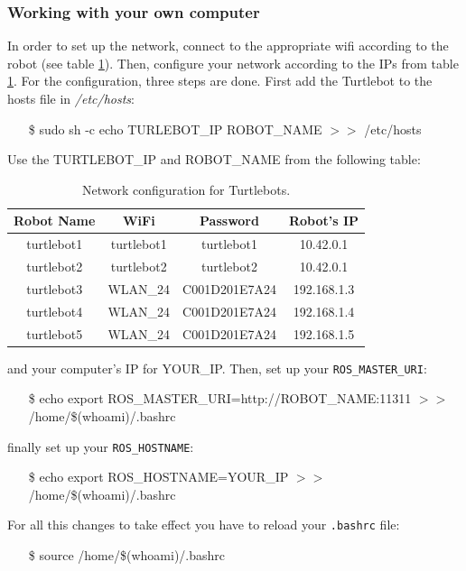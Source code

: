 \documentclass[a4paper,10pt]{article}
\begin{document}
\subsubsection{Working with your own computer}
In order to set up the network, connect to the appropriate wifi according to the robot (see table \ref{tab:ips}). Then, configure your network according to the IPs from table \ref{tab:ips}. For the configuration, three steps are done. First add the Turtlebot to the hosts file in \textit{/etc/hosts}: 
\begin{shaded}
	\begin{itemize}
		\item[\$] sudo sh -c \textquotesingle echo TURLEBOT\_IP  ROBOT\_NAME $>>$ /etc/hosts\textquotesingle
	\end{itemize}
\end{shaded}
Use the TURTLEBOT\_IP and ROBOT\_NAME from the following table:

\begin{table}[h!]
	\centering
	\begin{tabular}{|c|c|c|c|}
		\hline
		Robot Name & WiFi & Password & Robot's IP \\ \hline
		turtlebot1 & turtlebot1 & turtlebot1 & 10.42.0.1 \\ \hline
		turtlebot2 & turtlebot2 & turtlebot2 & 10.42.0.1 \\ \hline
		turtlebot3 & WLAN\_24 & C001D201E7A24 & 192.168.1.3 \\ \hline
		turtlebot4 & WLAN\_24 & C001D201E7A24 & 192.168.1.4 \\ \hline
		turtlebot5 & WLAN\_24 & C001D201E7A24 & 192.168.1.5 \\ \hline
	\end{tabular}
    \caption{Network configuration for Turtlebots. }
    \label{tab:ips}
\end{table}
and your computer's IP for YOUR\_IP. Then, set up your \texttt{ROS\_MASTER\_URI}:
\begin{shaded}
	\begin{itemize}
		\item[\$] echo export ROS\_MASTER\_URI=http://ROBOT\_NAME:11311 $>>$ /home/\$(whoami)/.bashrc
	\end{itemize}
\end{shaded}
finally set up your \texttt{ROS\_HOSTNAME}:
\begin{shaded}
	\begin{itemize}
		\item[\$] echo export ROS\_HOSTNAME=YOUR\_IP $>>$ /home/\$(whoami)/.bashrc
	\end{itemize}
\end{shaded}
For all this changes to take effect you have to reload your \texttt{.bashrc} file:
\begin{shaded}
	\begin{itemize}
		\item[\$] source /home/\$(whoami)/.bashrc
	\end{itemize}
\end{shaded}
\end{document}

